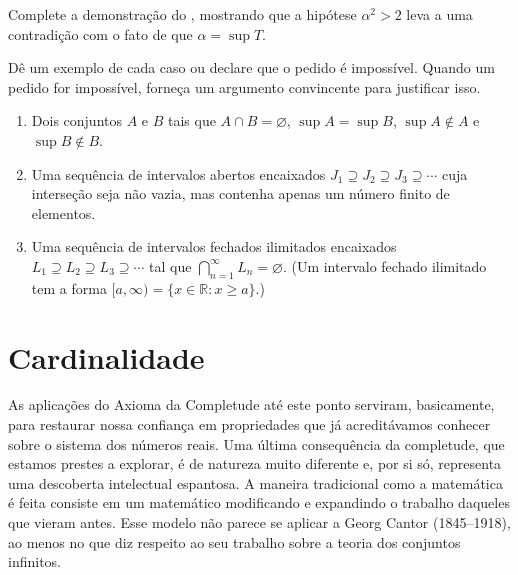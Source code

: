 \begin{exercise}\label{ex:finish-sqrt2}
Complete a demonstração do , mostrando que a hipótese $\alpha^2>2$ leva a uma contradição com o fato de que $\alpha=\sup T$.
\end{exercise}

\begin{exercise}\label{ex:exemplos-completude}
Dê um exemplo de cada caso ou declare que o pedido é impossível. Quando um pedido for impossível, forneça um argumento convincente para justificar isso.
\begin{enumerate}[label=\alph*)]
\item Dois conjuntos $A$ e $B$ tais que $A\cap B=\varnothing$, $\sup A=\sup B$, $\sup A\notin A$ e $\sup B\notin B$.
\item Uma sequência de intervalos abertos encaixados $J_1\supseteq J_2\supseteq J_3\supseteq\cdots$ cuja interseção seja não vazia, mas contenha apenas um número finito de elementos.
\item Uma sequência de intervalos fechados ilimitados encaixados $L_1\supseteq L_2\supseteq L_3\supseteq\cdots$ tal que $\bigcap_{n=1}^{\infty}L_n=\varnothing$. (Um intervalo fechado ilimitado tem a forma $[a,\infty)=\{x\in\mathbb{R}:x\geq a\}$.)
\end{enumerate}
\end{exercise}



\section{Cardinalidade}\label{sec:cardinalidade}

As aplicações do Axioma da Completude até este ponto serviram, basicamente, para restaurar nossa confiança em propriedades que já acreditávamos conhecer sobre o sistema dos números reais. Uma última consequência da completude, que estamos prestes a explorar, é de natureza muito diferente e, por si só, representa uma descoberta intelectual espantosa. A maneira tradicional como a matemática é feita consiste em um matemático modificando e expandindo o trabalho daqueles que vieram antes. Esse modelo não parece se aplicar a Georg Cantor (1845--1918), ao menos no que diz respeito ao seu trabalho sobre a teoria dos conjuntos infinitos.

